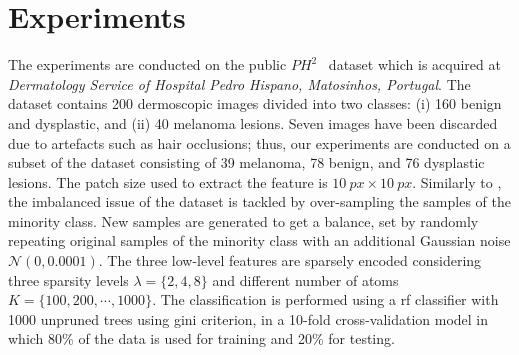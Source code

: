 \section{Experiments}
\label{sec:exp}
The experiments are conducted on the public $PH^2$~\cite{barata2013two} dataset which is acquired at \textit{Dermatology Service of Hospital Pedro Hispano, Matosinhos, Portugal}. 
The dataset contains 200 dermoscopic images divided into two classes: (i) 160 benign and dysplastic, and (ii) 40 melanoma lesions. 
Seven images have been discarded due to artefacts such as hair occlusions; thus, our experiments are conducted on a subset of the dataset consisting of 39 melanoma, 78 benign, and 76 dysplastic lesions.
The patch size used to extract the feature is $\SI{10}{px} \times \SI{10}{px}$.
Similarly to \cite{barata2013two}, the imbalanced issue of the dataset is tackled by over-sampling the samples of the minority class.
New samples are generated to get a balance, set by randomly repeating original samples of the minority class with an additional Gaussian noise $\mathcal{N}(0, 0.0001)$.
The three low-level features are sparsely encoded considering three sparsity levels $\lambda=\{2,4,8\}$ and different number of atoms $K = \{100, 200, \cdots, 1000\}$.
The classification is performed using a \ac{rf} classifier with 1000 unpruned trees using gini criterion, in a 10-fold cross-validation model in which 80\% of the data is used for training and 20\% for testing. 
 